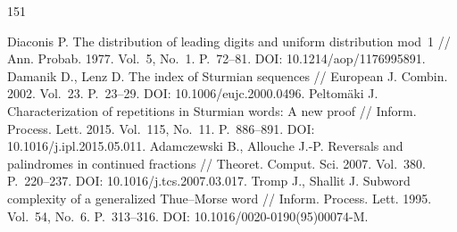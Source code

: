\documentclass[a4paper,14pt]{extreport}
\theoremstyle{plain}
\theoremstyle{definition}
\theoremstyle{remark}
\begin{document}
\begin{thebibliography}{151}
	
Diaconis P. The distribution of leading digits and uniform distribution mod~1 //
Ann. Probab. 1977. Vol.~5, No.~1. P.~72--81. DOI: 10.1214/aop/1176995891.
Damanik D., Lenz D. The index of Sturmian sequences //
European J. Combin. 2002. Vol.~23. P.~23--29. DOI: 10.1006/eujc.2000.0496.
Peltomäki J. Characterization of repetitions in Sturmian words: A new proof //
Inform. Process. Lett. 2015. Vol.~115, No.~11. P.~886--891.
DOI: 10.1016/j.ipl.2015.05.011.
Adamczewski B., Allouche J.-P. Reversals and palindromes in continued fractions //
Theoret. Comput. Sci. 2007. Vol.~380. P.~220--237.
DOI: 10.1016/j.tcs.2007.03.017.
Tromp J., Shallit J. Subword complexity of a generalized Thue--Morse word //
Inform. Process. Lett. 1995. Vol.~54, No.~6. P.~313--316.
DOI: 10.1016/0020-0190(95)00074-M.

\end{thebibliography}
	
\end{document}
